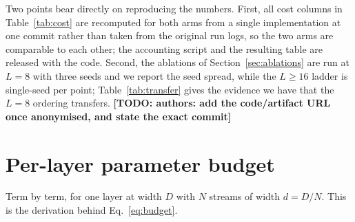 \documentclass{article}
\newcommand{\TODO}[1]{{\color{red}\textbf{[TODO: #1]}}}
\newcommand{\dmodel}{D}
\newcommand{\dsub}{d}
\newcommand{\nsub}{N}
\begin{document}
Two points bear directly on reproducing the numbers. First, all cost columns in
Table~\ref{tab:cost} are recomputed for both arms from a single implementation
at one commit rather than taken from the original run logs, so the two arms are
comparable to each other; the accounting script and the resulting table are
released with the code. Second, the ablations of Section~\ref{sec:ablations} are
run at $L{=}8$ with three seeds and we report the seed spread, while the
$L\ge16$ ladder is single-seed per point; Table~\ref{tab:transfer} gives the
evidence we have that the $L{=}8$ ordering transfers.
\TODO{authors: add the code/artifact URL once anonymised, and state the exact
commit}




\appendix
\section{Per-layer parameter budget}
\label{app:budget}

Term by term, for one layer at width $\dmodel$ with $\nsub$ streams of width
$\dsub=\dmodel/\nsub$. This is the derivation behind Eq.~\ref{eq:budget}.
\end{document}
